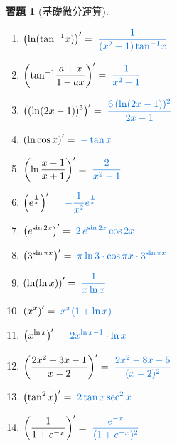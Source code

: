 \documentclass[12pt]{extarticle}
\newcommand{\ds}{\displaystyle}
\theoremstyle{definition}
\newtheorem*{exe}{習題}
\begin{document}
\begin{exe}[基礎微分運算]
\begin{multicols}{2}
\begin{enumerate}
      \item $\ds \left(\ln(\tan^{-1}\!x)\right)' = {\color{C2}\;\frac{1}{(x^2 + 1)\tan^{-1}\!x}}$
      \item $\ds \left(\tan^{-1}\!{\frac{a + x}{1 - a x}}\right)' = {\color{C2}\;\frac{1}{x^2 + 1}}$
      \item $\ds \left((\ln(2 x - 1))^3\right)' = {\color{C2}\;\frac{6\,(\ln(2 x - 1))^2}{2 x - 1}}$
      \item $\ds \left(\ln\cos x\right)' = {\color{C2}\;-\tan x}$
      \item $\ds \left(\ln\frac{x - 1}{x + 1}\right)' = {\color{C2}\;\frac{2}{x^2 - 1}}$
      \item $\ds \left(e^{\frac{1}{x}}\right)' = {\color{C2}\;-\frac{1}{x^2}e^{\frac{1}{x}}}$
      \item $\ds \left(e^{\sin 2x}\right)' = {\color{C2}\;2\,e^{\sin 2x}\cos 2x}$
      \item $\ds \left(3^{\sin\pi x}\right)' = {\color{C2}\;\pi\ln 3\cdot\cos\pi x\cdot 3^{\sin\pi x}}$
      \item $\ds\left(\ln(\ln x)\right)' = {\color{C2}\;\frac{1}{x\ln x}}$
      \item $\ds \left(x^x\right)' = {\color{C2}\;x^x(1 + \ln x)}$
      \item $\ds \left(x^{\ln x}\right)' = {\color{C2}\;2x^{\ln x - 1}\cdot\ln x}$
      \item $\ds\left(\frac{2x^2 + 3x - 1}{x - 2}\right)' = {\color{C2}\;\frac{2x^2 - 8x - 5}{(x - 2)^2}}$
      \item $\ds\left(\tan^2 x\right)' = {\color{C2}\;2\tan x\sec^2x}$
      \item $\ds\left(\frac{1}{1 + e^{-x}}\right)' = {\color{C2}\;\frac{e^{-x}}{(1 + e^{-x})^2}}$

\end{enumerate}
\end{multicols}
\end{exe}
\end{document}
